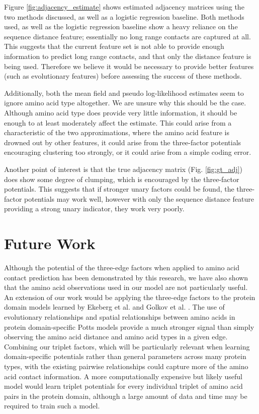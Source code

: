 \documentclass{article}
\begin{document}
Figure \ref{fig:adjacency_estimate} shows estimated adjacency matrices using the two methods discussed, as well as a logistic regression baseline. Both methods used, as well as the logistic regression baseline show a heavy reliance on the sequence distance feature; essentially no long range contacts are captured at all. This suggests that the current feature set is not able to provide enough information to predict long range contacts, and that only the distance feature is being used. Therefore we believe it would be necessary to provide better features (such as evolutionary features) before assessing the success of these methods.

Additionally, both the mean field and pseudo log-likelihood estimates seem to ignore amino acid type altogether. We are unsure why this should be the case. Although amino acid type does provide very little information, it should be enough to at least moderately affect the estimate. This could arise from a characteristic of the two approximations, where the amino acid feature is drowned out by other features, it could arise from the three-factor potentials encouraging clustering too strongly, or it could arise from a simple coding error.

Another point of interest is that the true adjacency matrix (Fig. \ref{fig:gt_adj}) does show some degree of clumping, which is encouraged by the three-factor potentials. This suggests that if stronger unary factors could be found, the three-factor potentials may work well, however with only the sequence distance feature providing a strong unary indicator, they work very poorly.


\section{Future Work}
Although the potential of the three-edge factors when applied to amino acid contact prediction has been demonstrated by this research, we have also shown that the amino acid observations used in our model are not particularly useful. An extension of our work would be applying the three-edge factors to the protein domain models learned by Ekeberg et al. and Golkov et al. \cite{ekeberg13} \cite{golkov16}. The use of evolutionary relationships and spatial relationships between amino acids in protein domain-specific Potts models provide a much stronger signal than simply observing the amino acid distance and amino acid types in a given edge. Combining our triplet factors, which will be particularly relevant when learning domain-specific potentials rather than general parameters across many protein types, with the existing pairwise relationships could capture more of the amino acid contact information. A more computationally expensive but likely useful model would learn triplet potentials for every individual triplet of amino acid pairs in the protein domain, although a large amount of data and time may be required to train such a model. 
\end{document}
